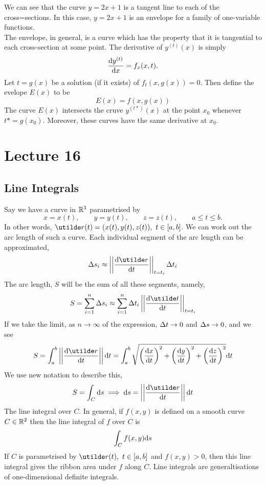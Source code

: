 \documentclass{report}
\begin{document}
We can see that the curve $y=2x+1$ is a tangent line to each of the cross=sections. In this case, $y=2x+1$ is an envelope for a family of one-variable functions. \\

The envelope, in general, is a curve which has the property that it is tangential to each cross-section at some point. The derivative of $y^{(t)}(x)$ is simply
$$
	\dyd[y^{(t)}]{x} = f_x(x,t).
$$
Let $t=g(x)$ be a solution (if it exists) of $f_t(x,g(x))=0$. Then define the evelope $E(x)$ to be
$$
	E(x) = f(x,g(x))
$$
The curve $E(x)$ intersects the cruve $y^{(t*)}(x)$ at the point $x_0$ whenever $t*=g(x_0)$. Moreover, these curves have the same derivative at $x_0$.


\section{Lecture 16}
\subsection*{Line Integrals}
Say we have a curve in $\bbr^3$ parametrised by
$$
	x=x(t),\qquad y=y(t),\qquad z=z(t),\qquad a\leq t\leq b.
$$
In other words, $\ut{r}(t) = (x(t), y(t), z(t)),\ t\in[a,b]$. We can work out the arc length of such a curve. Each individual segment of the arc length can be approximated,
$$
	\D s_i \approx \abs{\abs{\dyd[\ut{r}]{t}}}_{t=t_i}\D t_i
$$
The arc length, $S$ will be the sum of all these segments, namely,
$$
	S = \sum_{i=1}^{n}\D s_i \approx \sum_{i=1}^{n}\D t_i \abs{\abs{\dyd[\ut{t}]{t}}}_{t=t_i}
$$
If we take the limit, as $n\to\infty$ of the expression, $\D t\to0$ and $\D s\to0$, and we see
$$
	S = \int_a^b \abs{\abs{\dyd[\ut{r}]{t}}}\d t = \int_{a}^{b} \sqrt{\bracks{\dyd[x]{t}}^2 + \bracks{\dyd[y]{t}}^2 + \bracks{\dyd[z]{t}}^2}\d t
$$
We use new notation to describe this, 
$$
	S = \int_{C}\d s \implies \d s = \abs{\abs{\dyd[\ut{r}]{t}}}\d t
$$
The line integral over $C$. In general, if $f(x,y)$ is defined on a smooth curve $C\in\bbr^2$ then the line integral of $f$ over $C$ is 
$$
	\int_C f(x,y)\d s
$$
If $C$ is parametrised by $\ut{r}(t),\ t\in[a,b]$ and $f(x,y)>0$, then this line integral gives the ribbon area under $f$ along $C$. Line integrals are generaltisations of one-dimensional definite integrals.
\end{document}
